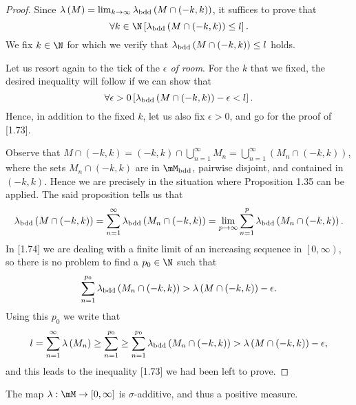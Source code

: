\documentclass[pmath450]{subfiles}
\begin{document}
    \begin{proof}
        Since $\lambda\left( M \right)=\lim_{k\to\infty}\lambda_{\operatorname{bdd}}\left( M\cap\left( -k,k \right) \right)$, it suffices to prove that
        \begin{equation}
            \forall k\in\N\left[ \lambda_{\bdd}\left( M\cap\left( -k,k \right) \right)\leq l \right].
        \end{equation}
        We fix $k\in\N$ for which we verify that $\lambda_{\operatorname{bdd}}\left( M\cap\left( -k,k \right) \right)\leq l$ holds. 

        Let us resort again to the tick of the \textit{$\epsilon$ of room}. For the $k$ that we fixed, the desired inequality will follow if we can show that
        \begin{equation}
            \forall\epsilon>0\left[ \lambda_{\operatorname{bdd}}\left( M\cap\left( -k,k \right) \right)-\epsilon<l \right].
        \end{equation}
        Hence, in addition to the fixed $k$, let us also fix $\epsilon>0$, and go for the proof of [1.73].

        Observe that $M\cap\left( -k,k \right)=\left( -k,k \right)\cap\bigcup^{\infty}_{n=1}M_n = \bigcup^{\infty}_{n=1}\left( M_n\cap\left( -k,k \right) \right)$, where the sets $M_n\cap\left( -k,k \right)$ are in $\mM_{\bdd}$, pairwise disjoint, and contained in $\left( -k,k \right)$. Hence we are precisely in the situation where Proposition 1.35 can be applied. The said proposition tells us that
        \begin{equation}
            \lambda_{\operatorname{bdd}}\left( M\cap\left( -k,k \right) \right)=\sum^{\infty}_{n=1}\lambda_{\operatorname{bdd}}\left( M_n\cap\left( -k,k \right) \right)=\lim_{p\to\infty} \sum^{p}_{n=1}\lambda_{\operatorname{bdd}}\left( M_n\cap\left( -k,k \right) \right).
        \end{equation}
        In [1.74] we are dealing with a finite limit of an increasing sequence in $\left[ 0,\infty \right)$, so there is no problem to find a $p_0\in\N$ such that
        \begin{equation*}
            \sum^{p_0}_{n=1}\lambda_{\operatorname{bdd}}\left( M_n\cap\left( -k,k \right) \right)>\lambda\left( M\cap\left( -k,k \right) \right)-\epsilon.
        \end{equation*}
        Using this $p_0$ we write that
        \begin{equation*}
            l = \sum^{\infty}_{n=1}\lambda\left( M_n \right)\geq\sum^{p_0}_{n=1} \geq \sum^{p_0}_{n=1}\lambda_{\operatorname{bdd}}\left( M_n\cap\left( -k,k \right) \right)>\lambda\left( M\cap\left( -k,k \right) \right)-\epsilon,
        \end{equation*}
        and this leads to the inequality [1.73] we had been left to prove.
    \end{proof}

    \begin{cor}{}
        The map $\lambda:\mM\to\left[ 0,\infty \right]$ is $\sigma$-additive, and thus a positive measure.
    \end{cor}	

\end{document}
